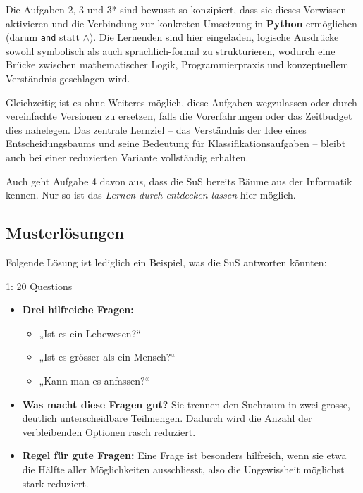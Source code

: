Die Aufgaben 2, 3 und 3* sind bewusst so konzipiert, dass sie dieses Vorwissen aktivieren und die Verbindung zur konkreten Umsetzung in \textbf{Python} ermöglichen (darum \texttt{and} statt $\land$). Die Lernenden sind hier eingeladen, logische Ausdrücke sowohl symbolisch als auch sprachlich-formal zu strukturieren, wodurch eine Brücke zwischen mathematischer Logik, Programmierpraxis und konzeptuellem Verständnis geschlagen wird.

Gleichzeitig ist es ohne Weiteres möglich, diese Aufgaben wegzulassen oder durch vereinfachte Versionen zu ersetzen, falls die Vorerfahrungen oder das Zeitbudget dies nahelegen. Das zentrale Lernziel – das Verständnis der Idee eines Entscheidungsbaums und seine Bedeutung für Klassifikationsaufgaben – bleibt auch bei einer reduzierten Variante vollständig erhalten.

Auch geht Aufgabe 4 davon aus, dass die SuS bereits Bäume aus der Informatik kennen. Nur so ist das \textit{Lernen durch entdecken lassen} hier möglich.

\subsection*{Musterlösungen}

Folgende Lösung ist lediglich ein Beispiel, was die SuS antworten könnten:
\begin{aufgabe}{1: 20 Questions}
\begin{itemize}
\item \textbf{Drei hilfreiche Fragen:}
\begin{itemize}
\item „Ist es ein Lebewesen?“
\item „Ist es grösser als ein Mensch?“
\item „Kann man es anfassen?“
\end{itemize}

\item \textbf{Was macht diese Fragen gut?}
Sie trennen den Suchraum in zwei grosse, deutlich unterscheidbare Teilmengen. Dadurch wird die Anzahl der verbleibenden Optionen rasch reduziert.

\item \textbf{Regel für gute Fragen:}
Eine Frage ist besonders hilfreich, wenn sie etwa die Hälfte aller Möglichkeiten ausschliesst, also die Ungewissheit möglichst stark reduziert.
\end{itemize}
\end{aufgabe}



